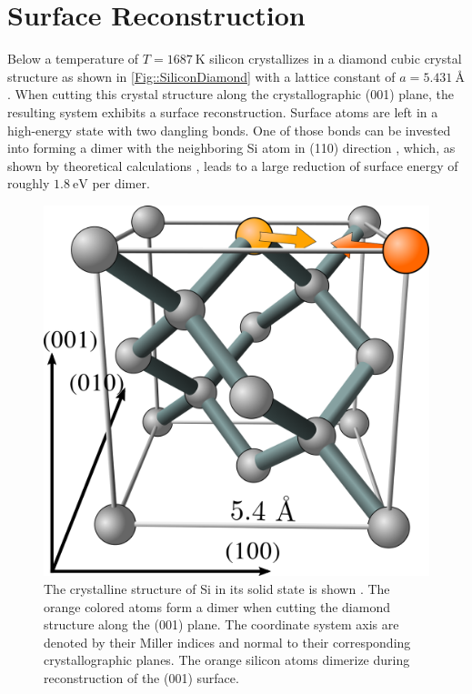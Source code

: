 	\section{Surface Reconstruction}
	Below a temperature of $T =	1687~\text{K}$ silicon crystallizes in a diamond cubic crystal structure as shown in \autoref{Fig::SiliconDiamond} with a lattice constant of $a =	5.431~\text{\AA} $ \cite{tiesinga2021codata}. When cutting this crystal structure along the crystallographic (001) plane, the resulting system exhibits a surface reconstruction. Surface atoms are left in a high-energy state with two dangling bonds. One of those bonds can be invested into forming a dimer with the neighboring Si atom in (110) direction \cite{chadi1979atomic}, which, as shown by theoretical calculations \cite{ramstad1995theoretical, batra1990atomic, dabrowski1992self}, leads to a large reduction of surface energy of roughly $1.8~\text{eV}$ per dimer.
	\begin{figure}[htp]
		\centering
		\includegraphics[width=0.5\linewidth]{graphics/Sili.png}
		\caption{The crystalline structure of Si in its solid state is shown \cite{sistrucure}. The orange colored atoms form a dimer when cutting the diamond structure along the (001) plane. The coordinate system axis are denoted by their Miller indices and normal to their corresponding crystallographic planes. The orange silicon atoms dimerize during reconstruction of the (001) surface.}
		\label{Fig::SiliconDiamond}
	\end{figure}
	
